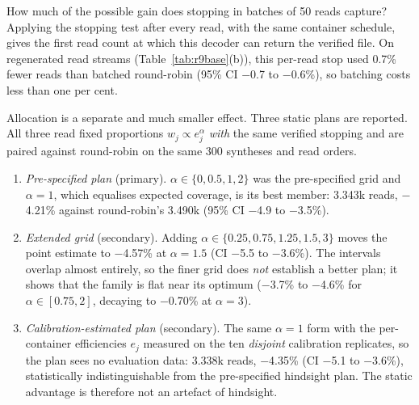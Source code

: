 \documentclass[acmsmall,screen]{acmart}
\begin{document}
How much of the possible gain does stopping in batches of 50 reads capture?  Applying the stopping test
after every read, with the same container schedule, gives the first read count at which this decoder can
return the verified file.  On regenerated read streams (Table~\ref{tab:r9base}(b)), this per-read stop
used 0.7\% fewer reads than batched round-robin (95\% CI $-$0.7 to $-$0.6\%), so batching costs less
than one per cent.

Allocation is a separate and much smaller effect.  Three static plans are reported.  All three read fixed
proportions $w_j\propto e_j^{\alpha}$ \emph{with} the same verified stopping and are paired against
round-robin on the same 300 syntheses and read orders.
\begin{enumerate}
\item \emph{Pre-specified plan} (primary).  $\alpha\in\{0,0.5,1,2\}$ was the pre-specified grid and
$\alpha{=}1$, which equalises expected coverage, is its best member: 3.343k reads, $-$4.21\% against
round-robin's 3.490k (95\% CI $-$4.9 to $-$3.5\%).
\item \emph{Extended grid} (secondary).  Adding $\alpha\in\{0.25,0.75,1.25,1.5,3\}$ moves the point
estimate to $-$4.57\% at $\alpha{=}1.5$ (CI $-$5.5 to $-$3.6\%).  The intervals overlap almost entirely, so
the finer grid does \emph{not} establish a better plan; it shows that the family is flat near its
optimum ($-$3.7\% to $-$4.6\% for $\alpha\in[0.75,2]$, decaying to $-$0.70\% at $\alpha{=}3$).
\item \emph{Calibration-estimated plan} (secondary).  The same $\alpha{=}1$ form with the per-container
efficiencies $e_j$ measured on the ten \emph{disjoint} calibration replicates, so the plan sees no
evaluation data: 3.338k reads, $-$4.35\% (CI $-$5.1 to $-$3.6\%), statistically indistinguishable from the
pre-specified hindsight plan.  The static advantage is therefore not an artefact of hindsight.
\end{enumerate}
\end{document}
